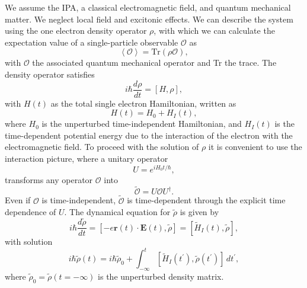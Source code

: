 We assume the IPA, a classical electromagnetic field, and quantum mechanical
matter. We neglect local field and excitonic effects. We can describe the system
using the one electron density operator ${\rho}$, with which we can calculate
the expectation value of a single-particle observable $\mathcal{O}$ as
\begin{equation}\label{traza}
\left\langle\mathcal{O}\right\rangle
= \mathrm{Tr}(\rho\mathcal{O}),
\end{equation}
with $\mathcal{O}$ the associated quantum mechanical operator and Tr the 
trace. The density operator satisfies
\begin{equation}\label{eqrho}
i\hbar \frac{d\rho}{dt} = \left[H,\rho\right],
\end{equation}
with $H(t)$ as the total single electron Hamiltonian, written as 
\begin{equation*}
H(t) = H_{0} + H_{I}(t),  
\label{achea}
\end{equation*}
where $H_{0}$ is the unperturbed time-independent Hamiltonian, and $H_{I}(t)$ is
the time-dependent potential energy due to the interaction of the electron with
the electromagnetic field. To proceed with the solution of $\rho$ it is
convenient to use the interaction picture, where a unitary operator
\begin{equation}\label{ou}
U = e^{iH_{0}t/\hbar},
\end{equation}
transforms any operator $\mathcal{O}$ into
\begin{equation}\label{ip}
\tilde{\mathcal{O}} = U\mathcal{O}U^{\dagger}.
\end{equation}
Even if $\mathcal{O}$ is time-independent, $\tilde{\mathcal{O}}$ is
time-dependent through the explicit time dependence of $U$. The dynamical
equation for $\tilde{\rho}$ is given by
\begin{equation}\label{intrho}
i\hbar \frac{d\tilde{\rho}}{dt}
= \left[-e\mathbf{r}(t)\cdot\mathbf{E}(t),\tilde{\rho}\right]
= [\tilde{H}_{I}(t), \tilde{\rho}],
\end{equation}
with solution 
\begin{equation}\label{intrho2}
i\hbar \tilde{\rho}(t)
= i\hbar \tilde{\rho}_{0} + 
\int_{-\infty}^{t}
\left[\tilde{H}_{I}(t^{\prime}),\tilde{\rho}(t^{\prime})\right]\,dt^{\prime},  
\end{equation}
where $\tilde{\rho}_{0} = \tilde{\rho}(t = -\infty)$ is the unperturbed density
matrix.

